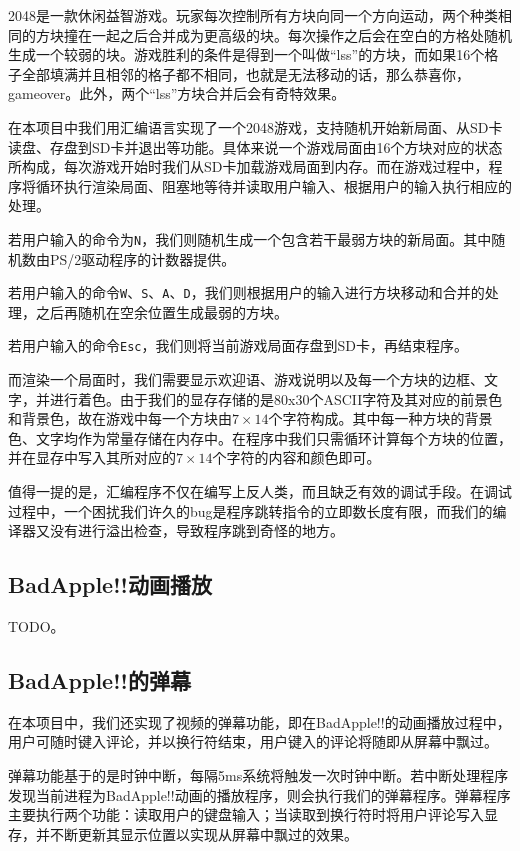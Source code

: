 \documentclass[11pt,utf8]{report}
\begin{document}
2048是一款休闲益智游戏。玩家每次控制所有方块向同一个方向运动，两个种类相同的方块撞在一起之后合并成为更高级的块。每次操作之后会在空白的方格处随机生成一个较弱的块。游戏胜利的条件是得到一个叫做“lss”的方块，而如果16个格子全部填满并且相邻的格子都不相同，也就是无法移动的话，那么恭喜你，gameover。此外，两个“lss”方块合并后会有奇特效果。

在本项目中我们用汇编语言实现了一个2048游戏，支持随机开始新局面、从SD卡读盘、存盘到SD卡并退出等功能。具体来说一个游戏局面由16个方块对应的状态所构成，每次游戏开始时我们从SD卡加载游戏局面到内存。而在游戏过程中，程序将循环执行渲染局面、阻塞地等待并读取用户输入、根据用户的输入执行相应的处理。

若用户输入的命令为\texttt{N}，我们则随机生成一个包含若干最弱方块的新局面。其中随机数由PS/2驱动程序的计数器提供。

若用户输入的命令\texttt{W}、\texttt{S}、\texttt{A}、\texttt{D}，我们则根据用户的输入进行方块移动和合并的处理，之后再随机在空余位置生成最弱的方块。

若用户输入的命令\texttt{Esc}，我们则将当前游戏局面存盘到SD卡，再结束程序。

而渲染一个局面时，我们需要显示欢迎语、游戏说明以及每一个方块的边框、文字，并进行着色。由于我们的显存存储的是80x30个ASCII字符及其对应的前景色和背景色，故在游戏中每一个方块由$7\times14$个字符构成。其中每一种方块的背景色、文字均作为常量存储在内存中。在程序中我们只需循环计算每个方块的位置，并在显存中写入其所对应的$7\times14$个字符的内容和颜色即可。

值得一提的是，汇编程序不仅在编写上反人类，而且缺乏有效的调试手段。在调试过程中，一个困扰我们许久的bug是程序跳转指令的立即数长度有限，而我们的编译器又没有进行溢出检查，导致程序跳到奇怪的地方。


\subsection{BadApple!!动画播放} 
	\par TODO。

\subsection{BadApple!!的弹幕}

在本项目中，我们还实现了视频的弹幕功能，即在BadApple!!的动画播放过程中，用户可随时键入评论，并以换行符结束，用户键入的评论将随即从屏幕中飘过。

弹幕功能基于的是时钟中断，每隔5ms系统将触发一次时钟中断。若中断处理程序发现当前进程为BadApple!!动画的播放程序，则会执行我们的弹幕程序。弹幕程序主要执行两个功能：读取用户的键盘输入；当读取到换行符时将用户评论写入显存，并不断更新其显示位置以实现从屏幕中飘过的效果。
\end{document}
